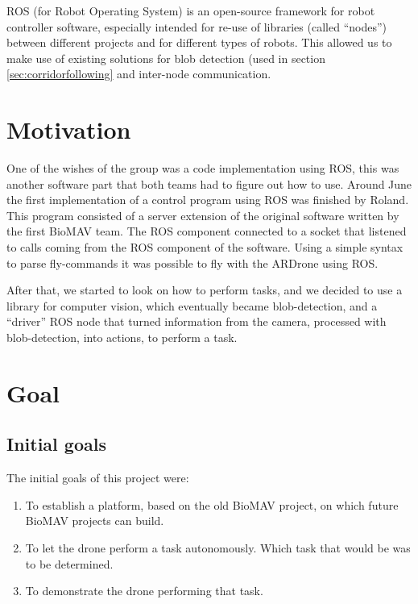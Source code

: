 \documentclass[a4paper,10pt]{article}
\begin{document}
ROS (for Robot Operating System) is an open-source framework for robot
controller software, especially intended for re-use of libraries
(called ``nodes'') between different projects and for different types of
robots. This allowed us to make use of existing solutions for blob
detection (used in section \ref{sec:corridorfollowing} and inter-node communication.

\section{Motivation}
\label{sec:motivation}
One of the wishes of the group was a code implementation using ROS, this was another software part that both teams had to figure out how to use. 
Around June the first implementation of a control program using ROS was finished by Roland. 
This program consisted of a server extension of the original software written by the first BioMAV team.  
The ROS component connected to a socket that listened to calls coming from the ROS component of the software. 
Using a simple syntax to parse fly-commands it was possible to fly with the ARDrone using ROS.  

After that, we started to look on how to perform tasks, and we decided
to use a library for computer vision, which eventually became
blob-detection, and a ``driver'' ROS node that turned information from
the camera, processed with blob-detection, into actions, to perform a
task.

\section{Goal}
\label{sec:goal}
\subsection{Initial goals}
\label{sec:initialgoals}
The initial goals of this project were:
\begin{enumerate}
\item To establish a platform, based on the old BioMAV project, on which
      future BioMAV projects can build.
\item To let the drone perform a task autonomously. Which task that would be
      was to be determined.
\item To demonstrate the drone performing that task.
\end{enumerate}
\end{document}
